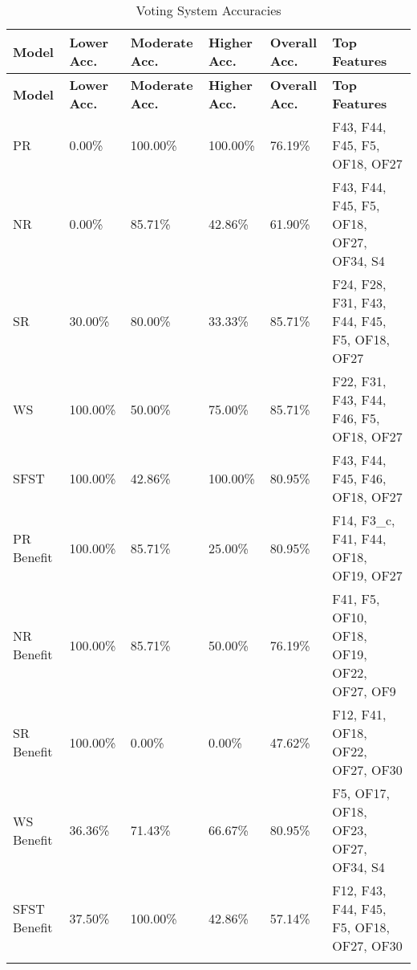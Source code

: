 \begin{longtable}{|p{1.5cm}|p{2.0cm}|p{2.0cm}|p{2.0cm}|p{2.0cm}|p{4cm}|}
\hline
\textbf{Model} & \textbf{Lower Acc.} & \textbf{Moderate Acc.} & \textbf{Higher Acc.} & \textbf{Overall Acc.} & \textbf{Top Features} \\ \hline
\endfirsthead
\hline
\textbf{Model} & \textbf{Lower Acc.} & \textbf{Moderate Acc.} & \textbf{Higher Acc.} & \textbf{Overall Acc.} & \textbf{Top Features} \\ \hline
\endhead


PR & 0.00\% & 100.00\% & 100.00\% & 76.19\% & F43, F44, F45, F5, OF18, OF27 \\ \hline
NR & 0.00\% & 85.71\% & 42.86\% & 61.90\% & F43, F44, F45, F5, OF18, OF27, OF34, S4 \\ \hline
SR & 30.00\% & 80.00\% & 33.33\% & 85.71\% & F24, F28, F31, F43, F44, F45, F5, OF18, OF27 \\ \hline
WS & 100.00\% & 50.00\% & 75.00\% & 85.71\% & F22, F31, F43, F44, F46, F5, OF18, OF27 \\ \hline
SFST & 100.00\% & 42.86\% & 100.00\% & 80.95\% & F43, F44, F45, F46, OF18, OF27 \\ \hline

PR Benefit & 100.00\% & 85.71\% & 25.00\% & 80.95\% & F14, F3\_c, F41, F44, OF18, OF19, OF27 \\ \hline
NR Benefit & 100.00\% & 85.71\% & 50.00\% & 76.19\% & F41, F5, OF10, OF18, OF19, OF22, OF27, OF9 \\ \hline
SR Benefit & 100.00\% & 0.00\% & 0.00\% & 47.62\% & F12, F41, OF18, OF22, OF27, OF30 \\ \hline
WS Benefit & 36.36\% & 71.43\% & 66.67\% & 80.95\% & F5, OF17, OF18, OF23, OF27, OF34, S4 \\ \hline
SFST Benefit & 37.50\% & 100.00\% & 42.86\% & 57.14\% & F12, F43, F44, F45, F5, OF18, OF27, OF30 \\ \hline

\caption{Voting System Accuracies}
\label{tab:grouping_3b}
\end{longtable}